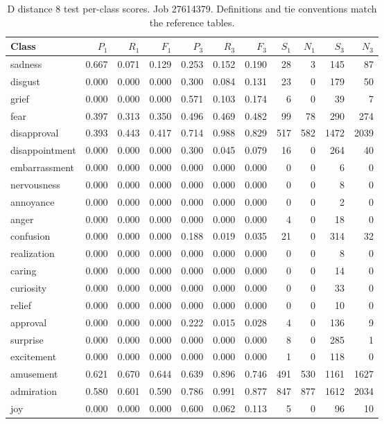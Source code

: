 \begin{table}[!htbp]
\centering
\scriptsize
\setlength{\tabcolsep}{5pt}
\begin{tabular}{lrrrrrrrrrr}
\toprule
Class & $P_1$ & $R_1$ & $F_1$ & $P_3$ & $R_3$ & $F_3$ & $S_1$ & $N_1$ & $S_3$ & $N_3$ \\
\midrule
sadness & 0.667 & 0.071 & 0.129 & 0.253 & 0.152 & 0.190 & 28 & 3 & 145 & 87 \\
disgust & 0.000 & 0.000 & 0.000 & 0.300 & 0.084 & 0.131 & 23 & 0 & 179 & 50 \\
grief & 0.000 & 0.000 & 0.000 & 0.571 & 0.103 & 0.174 & 6 & 0 & 39 & 7 \\
fear & 0.397 & 0.313 & 0.350 & 0.496 & 0.469 & 0.482 & 99 & 78 & 290 & 274 \\
disapproval & 0.393 & 0.443 & 0.417 & 0.714 & 0.988 & 0.829 & 517 & 582 & 1472 & 2039 \\
disappointment & 0.000 & 0.000 & 0.000 & 0.300 & 0.045 & 0.079 & 16 & 0 & 264 & 40 \\
embarrassment & 0.000 & 0.000 & 0.000 & 0.000 & 0.000 & 0.000 & 0 & 0 & 6 & 0 \\
nervousness & 0.000 & 0.000 & 0.000 & 0.000 & 0.000 & 0.000 & 0 & 0 & 8 & 0 \\
annoyance & 0.000 & 0.000 & 0.000 & 0.000 & 0.000 & 0.000 & 0 & 0 & 2 & 0 \\
anger & 0.000 & 0.000 & 0.000 & 0.000 & 0.000 & 0.000 & 4 & 0 & 18 & 0 \\
confusion & 0.000 & 0.000 & 0.000 & 0.188 & 0.019 & 0.035 & 21 & 0 & 314 & 32 \\
realization & 0.000 & 0.000 & 0.000 & 0.000 & 0.000 & 0.000 & 0 & 0 & 8 & 0 \\
caring & 0.000 & 0.000 & 0.000 & 0.000 & 0.000 & 0.000 & 0 & 0 & 14 & 0 \\
curiosity & 0.000 & 0.000 & 0.000 & 0.000 & 0.000 & 0.000 & 0 & 0 & 33 & 0 \\
relief & 0.000 & 0.000 & 0.000 & 0.000 & 0.000 & 0.000 & 0 & 0 & 10 & 0 \\
approval & 0.000 & 0.000 & 0.000 & 0.222 & 0.015 & 0.028 & 4 & 0 & 136 & 9 \\
surprise & 0.000 & 0.000 & 0.000 & 0.000 & 0.000 & 0.000 & 8 & 0 & 285 & 1 \\
excitement & 0.000 & 0.000 & 0.000 & 0.000 & 0.000 & 0.000 & 1 & 0 & 118 & 0 \\
amusement & 0.621 & 0.670 & 0.644 & 0.639 & 0.896 & 0.746 & 491 & 530 & 1161 & 1627 \\
admiration & 0.580 & 0.601 & 0.590 & 0.786 & 0.991 & 0.877 & 847 & 877 & 1612 & 2034 \\
joy & 0.000 & 0.000 & 0.000 & 0.600 & 0.062 & 0.113 & 5 & 0 & 96 & 10 \\
\bottomrule
\end{tabular}
\caption{D distance 8 test per-class scores. Job 27614379. Definitions and tie conventions match the reference tables.}
\label{tab:classes-d_distance_k8}
\end{table}
